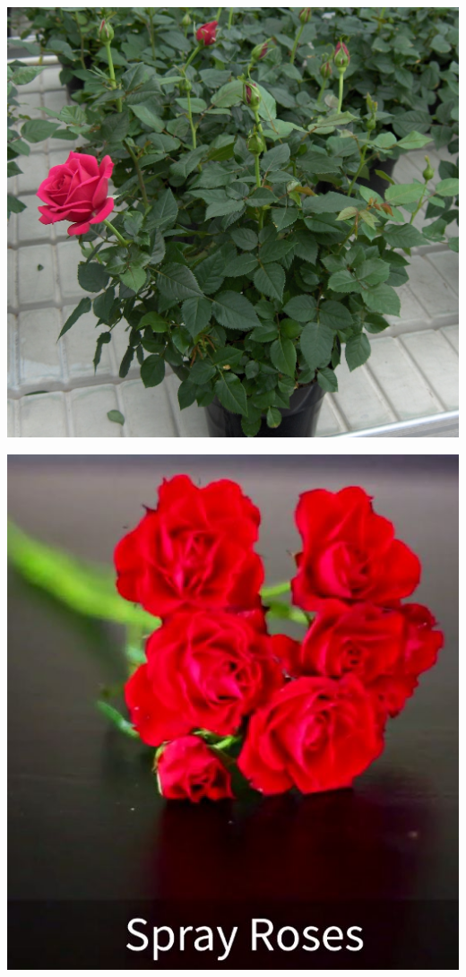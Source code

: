\documentclass{article}
\begin{document}
\begin{center}
\includegraphics[height=0.925\paperheight]{../Rose_Potted.jpg}
\end{center}
\newpage

\begin{center}
\includegraphics[height=0.925\paperheight]{../Rose_Spray.jpg}
\end{center}
\newpage
\end{document}
